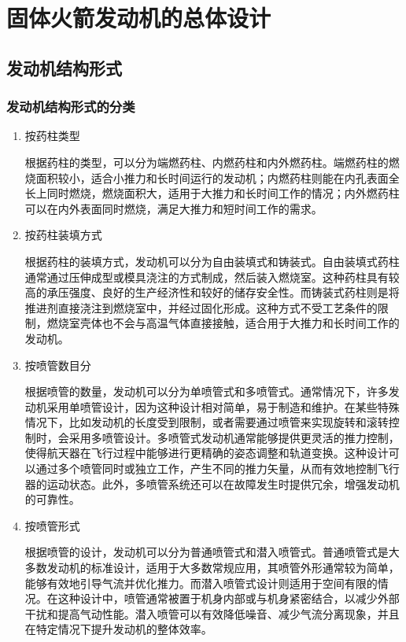 
\chapter{固体火箭发动机的总体设计}

\section{发动机结构形式}

\subsection{发动机结构形式的分类}

\begin{enumerate}[leftmargin=0em,itemindent=2em]
    \item 按药柱类型
    
    \qquad 根据药柱的类型，可以分为端燃药柱、内燃药柱和内外燃药柱。端燃药柱的燃烧面积较小，适合小推力和长时间运行的发动机；内燃药柱则能在内孔表面全长上同时燃烧，燃烧面积大，适用于大推力和长时间工作的情况；内外燃药柱可以在内外表面同时燃烧，满足大推力和短时间工作的需求。

    \item 按药柱装填方式
    
    \qquad 根据药柱的装填方式，发动机可以分为自由装填式和铸装式。自由装填式药柱通常通过压伸成型或模具浇注的方式制成，然后装入燃烧室。这种药柱具有较高的承压强度、良好的生产经济性和较好的储存安全性。而铸装式药柱则是将推进剂直接浇注到燃烧室中，并经过固化形成。这种方式不受工艺条件的限制，燃烧室壳体也不会与高温气体直接接触，适合用于大推力和长时间工作的发动机。

    \item 按喷管数目分
    
    \qquad 根据喷管的数量，发动机可以分为单喷管式和多喷管式。通常情况下，许多发动机采用单喷管设计，因为这种设计相对简单，易于制造和维护。在某些特殊情况下，比如发动机的长度受到限制，或者需要通过喷管来实现旋转和滚转控制时，会采用多喷管设计。多喷管式发动机通常能够提供更灵活的推力控制，使得航天器在飞行过程中能够进行更精确的姿态调整和轨道变换。这种设计可以通过多个喷管同时或独立工作，产生不同的推力矢量，从而有效地控制飞行器的运动状态。此外，多喷管系统还可以在故障发生时提供冗余，增强发动机的可靠性。

    \item 按喷管形式
    
    \qquad 
    根据喷管的设计，发动机可以分为普通喷管式和潜入喷管式。普通喷管式是大多数发动机的标准设计，适用于大多数常规应用，其喷管外形通常较为简单，能够有效地引导气流并优化推力。而潜入喷管式设计则适用于空间有限的情况。在这种设计中，喷管通常被置于机身内部或与机身紧密结合，以减少外部干扰和提高气动性能。潜入喷管可以有效降低噪音、减少气流分离现象，并且在特定情况下提升发动机的整体效率。


\end{enumerate}
